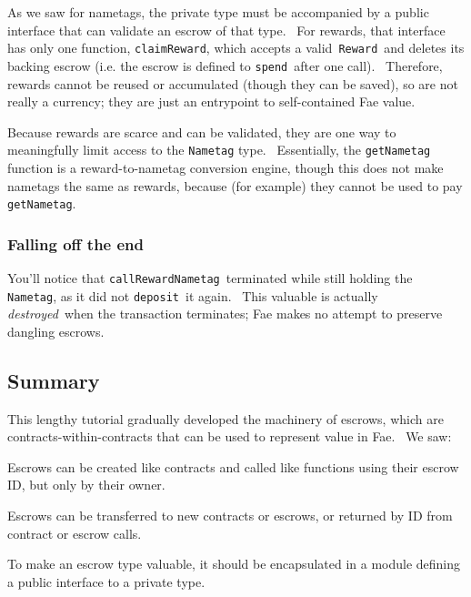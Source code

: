 \documentclass[11pt]{article}
\begin{document}
As we saw for nametags, the private type must be accompanied by a public interface that can validate an escrow of that type.  For rewards, that interface has only one function, \texttt{claimReward}, which accepts a valid \texttt{Reward} and deletes its backing escrow (i.e. the escrow is defined to \texttt{spend} after one call).  Therefore, rewards cannot be reused or accumulated (though they can be saved), so are not really a currency; they are just an entrypoint to self-contained Fae value.


\vspace{11pt}

Because rewards are scarce and can be validated, they are one way to meaningfully limit access to the \texttt{Nametag} type.  Essentially, the \texttt{getNametag} function is a reward-to-nametag conversion engine, though this does not make nametags the same as rewards, because (for example) they cannot be used to pay \texttt{getNametag}.

\subsubsection{Falling off the end}
\vspace{5.5pt}

You'll notice that \texttt{callRewardNametag} terminated while still holding the \texttt{Nametag}, as it did not \texttt{deposit} it again.  This valuable is actually \textit{destroyed} when the transaction terminates; Fae makes no attempt to preserve dangling escrows.

\subsection{Summary}
\vspace{5.5pt}

This lengthy tutorial gradually developed the machinery of escrows, which are contracts-within-contracts that can be used to represent value in Fae.  We saw:


\vspace{5.5pt}\begin{longitem}
\item{Escrows can be created like contracts and called like functions using their escrow ID, but only by their owner.}
\item{Escrows can be transferred to new contracts or escrows, or returned by ID from contract or escrow calls.}
\item{To make an escrow type valuable, it should be encapsulated in a module defining a public interface to a private type.}
\end{longitem}
\end{document}
